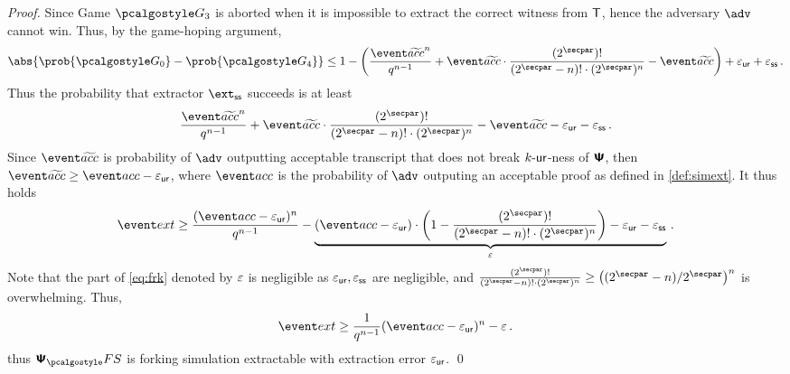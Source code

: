 \documentclass[runningheads,10pt]{llncs}
\begin{document}
\begin{proof}
Since Game $\game{3}$ is aborted when it is impossible to extract the correct witness
from $\mathsf{T}$, hence the adversary $\advse$ cannot win.  Thus, by the game-hoping
argument,
\[
	\abs{\prob{\game{0}} - \prob{\game{4}}} \leq 1 -
  \left(\frac{\waccProb^{n}}{q^{n - 1}} + \waccProb \cdot \frac{(2^\secpar)
      !}{(2^\secpar - n)! \cdot (2^\secpar)^{n}} - \waccProb\right) + \epsur +
  \epsss\,.
\]
Thus the probability that extractor $\extss$ succeeds is at least
\[
	\frac{\waccProb^{n}}{q^{n - 1}} + \waccProb \cdot \frac{(2^\secpar)
    !}{(2^\secpar - n)! \cdot (2^\secpar)^{n}} - \waccProb - \epsur 
  - \epsss\,.
\]
Since $\waccProb$ is probability of $\advse$ outputting acceptable transcript
that does not break ${k\text{-}\mathsf{ur}}$-ness of $\bm{\mathsf{\Psi}}$, then $\waccProb \geq \accProb -
\epsur$, where $\accProb$ is the probability of $\advse$ outputing an acceptable
proof as defined in \cref{def:simext}. It thus holds
\[
	\label{eq:frk}
	\extProb \geq \frac{(\accProb - \epsur)^{n}}{q^{n - 1}} -
  \underbrace{(\accProb - \epsur) \cdot \left( 1 - \frac{(2^\secpar)
        !}{(2^\secpar - n)! \cdot (2^\secpar)^{n}}\right) - \epsur -
    \epsss}_{\eps}\,.
\]
Note that the part of \cref{eq:frk} denoted by $\varepsilon$ is negligible as
$\varepsilon_{\mathsf{ur}}, \varepsilon_{\mathsf{ss}}$ are negligible, and
$\frac{(2^\secpar) !}{(2^\secpar - n)! \cdot (2^\secpar)^{n}} \geq
\left(\infrac{(2^\secpar - n)}{2^\secpar}\right)^{n}$ is overwhelming.  Thus,
\[
	\extProb \geq \frac{1}{q^{n - 1}} (\accProb - \epsur)^{n} -\eps\,.
\] 
thus $\psfs$ is forking simulation extractable with extraction error $\varepsilon_{\mathsf{ur}}$.
\qed
\end{proof}

\end{document}
